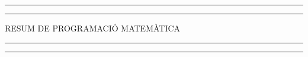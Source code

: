 \newcommand{\plogo}{\fbox{$\mathcal{PL}$}} %

\begin{titlepage} %
	\centering %
	
	\scshape %
	
	\vspace*{5\baselineskip} %
	
	
	\rule{\textwidth}{1.6pt}\vspace*{-\baselineskip}\vspace*{2pt} %
	\rule{\textwidth}{0.4pt} %
	
	\vspace{0.75\baselineskip} %
	
	{\LARGE RESUM DE PROGRAMACIÓ MATEMÀTICA\\} %
	
	\vspace{0.75\baselineskip} %
	
	\rule{\textwidth}{0.4pt}\vspace*{-\baselineskip}\vspace{3.2pt} %
	\rule{\textwidth}{1.6pt} %
	
	\vspace{1.5\baselineskip} %
	
	
	
	\vspace*{1\baselineskip} %
	
	
	
	
	\vspace{1\baselineskip} %
	

\end{titlepage}

